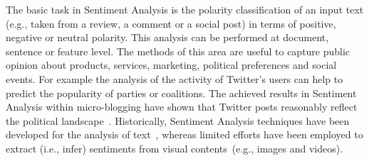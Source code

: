 The basic task in Sentiment Analysis is the polarity classification of an input text (e.g., taken from a review, a comment or a social post) in terms of positive, negative or neutral polarity. This analysis can be performed at document, sentence or feature level. The methods of this area are useful to capture public opinion about products, services, marketing, political preferences and social events. For example the analysis of the activity of Twitter's users can help to predict the popularity of parties or coalitions. The achieved results in Sentiment Analysis within micro-blogging have shown that Twitter posts reasonably reflect the political landscape~\cite{tumasjan2010predicting}.
Historically, Sentiment Analysis techniques have been developed for the analysis of text~\cite{pang2008opinion}, whereas limited efforts have been employed to extract (i.e., infer) sentiments from visual contents~(e.g., images and videos). %

